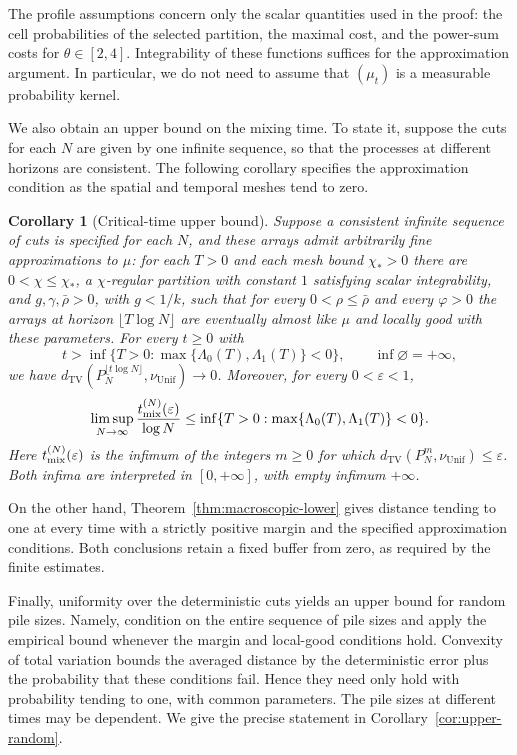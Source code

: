 \documentclass[11pt]{article}
\numberwithin{equation}{section}
\newtheorem{corollary}[theorem]{Corollary}
\theoremstyle{definition}
\theoremstyle{remark}
\newcommand{\TV}{\mathrm{TV}}
\newcommand{\Unif}{\mathrm{Unif}}
\newcommand{\dTV}{d_{\TV}}
\newcommand{\nuUnif}{\nu_{\Unif}}
\newcommand{\1}{\mathbf 1}
\begin{document}
The profile assumptions concern only the scalar quantities used in the
proof: the cell probabilities of the selected partition, the maximal
cost, and the power-sum costs for $\theta\in[2,4]$. Integrability of
these functions suffices for the approximation argument. In particular,
we do not need to assume that $(\mu_t)$ is a measurable probability
kernel.

We also obtain an upper bound on the mixing time. To state it, suppose
the cuts for each $N$ are given by one infinite sequence, so that the
processes at different horizons are consistent. The following corollary
specifies the approximation condition as the spatial and temporal
meshes tend to zero.

\begin{corollary}[Critical-time upper bound]%
\label{cor:upper-critical}
Suppose a consistent infinite sequence of cuts is specified for each
$N$, and these arrays admit arbitrarily fine approximations to $\mu$:
for each $T>0$ and each mesh bound $\chi_*>0$ there are
$0<\chi\le\chi_*$, a $\chi$-regular partition with constant $1$ satisfying
scalar integrability, and $g,\gamma,\bar\rho>0$, with $g<1/k$,
such that for every $0<\rho\le\bar\rho$ and every $\varphi>0$ the
arrays at horizon $\lfloor T\log N\rfloor$ are eventually almost
like $\mu$ and locally good with these parameters. For every $t\ge0$ with
\[
 t>\inf\{T>0:\max\{\Lambda_0(T),\Lambda_1(T)\}<0\},
 \qquad \inf\varnothing=+\infty,
\]
we have $\dTV(P_N^{\lfloor t\log N\rfloor},\nuUnif)\to0$.
Moreover, for every $0<\varepsilon<1$,
\[
 \limsup_{N\to\infty}\frac{t_{\rm mix}^{(N)}(\varepsilon)}{\log N}
       \le\inf\{T>0:\max\{\Lambda_0(T),\Lambda_1(T)\}<0\}.
\]
Here $t_{\rm mix}^{(N)}(\varepsilon)$ is the infimum of the integers
$m\ge0$ for which $\dTV(P_N^m,\nuUnif)\le\varepsilon$.
Both infima are interpreted in $[0,+\infty]$, with empty infimum
$+\infty$.
\end{corollary}

On the other hand, Theorem~\ref{thm:macroscopic-lower} gives distance
tending to one at every time with a strictly positive margin and the
specified approximation conditions. Both conclusions retain a fixed
buffer from zero, as required by the finite estimates.

Finally, uniformity over the deterministic cuts yields an upper bound
for random pile sizes. Namely, condition on the entire sequence of pile
sizes and apply the empirical bound whenever the margin and local-good
conditions hold. Convexity of total variation bounds the averaged
distance by the deterministic error plus the probability that these
conditions fail. Hence they need only hold with probability tending to
one, with common parameters. The pile sizes at different times may be
dependent. We give the precise statement in
Corollary~\ref{cor:upper-random}.
\end{document}
